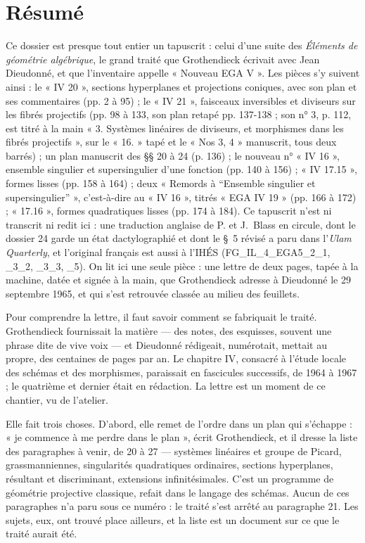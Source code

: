 \documentclass[11pt,a4paper]{article}
\begin{document}
\section*{Résumé}

\begin{resume}
Ce dossier est presque tout entier un tapuscrit : celui d'une suite des
\emph{Éléments de géométrie algébrique}, le grand traité que Grothendieck
écrivait avec Jean Dieudonné, et que l'inventaire appelle « Nouveau EGA V ». Les
pièces s'y suivent ainsi : le « IV 20 », sections hyperplanes et projections
coniques, avec son plan et ses commentaires (pp. 2 à 95) ; le « IV 21 »,
faisceaux inversibles et diviseurs sur les fibrés projectifs (pp. 98 à 133, son
plan retapé pp. 137-138 ; son n° 3, p. 112, est titré à la main « 3. Systèmes
linéaires de diviseurs, et morphismes dans les fibrés projectifs », sur le
« 16. » tapé et le « Nos 3, 4 » manuscrit, tous deux barrés) ; un plan manuscrit des §§ 20 à 24 (p. 136) ; le
nouveau n° « IV 16 », ensemble singulier et supersingulier d'une fonction
(pp. 140 à 156) ; « IV 17.15 », formes lisses (pp. 158 à 164) ; deux
« Remords à “Ensemble singulier et supersingulier” », c'est-à-dire au
« IV 16 », titrés « EGA IV 19 » (pp. 166 à 172) ; « 17.16 », formes quadratiques
lisses (pp. 174 à 184). Ce tapuscrit n'est ni transcrit ni redit ici : une
traduction anglaise de P. et J.~Blass en circule, dont le dossier 24 garde un
état dactylographié et dont le §~5 révisé a paru dans l'\emph{Ulam Quarterly},
et l'original français est aussi à l'IHÉS (FG\_IL\_4\_EGA5\_2\_1, \_3\_2,
\_3\_3, \_5). On lit ici une seule pièce : une lettre de deux pages, tapée à la
machine, datée et signée à la main, que Grothendieck adresse à Dieudonné le
29 septembre 1965, et qui s'est retrouvée classée au milieu des feuillets.

Pour comprendre la lettre, il faut savoir comment se fabriquait le traité.
Grothendieck fournissait la matière — des notes, des esquisses, souvent une
phrase dite de vive voix — et Dieudonné rédigeait, numérotait, mettait au
propre, des centaines de pages par an. Le chapitre IV, consacré à l'étude
locale des schémas et des morphismes, paraissait en fascicules successifs, de
1964 à 1967 ; le quatrième et dernier était en rédaction. La lettre est un moment de ce chantier, vu
de l'atelier.

Elle fait trois choses. D'abord, elle remet de l'ordre dans un plan qui
s'échappe : « je commence à me perdre dans le plan », écrit Grothendieck, et il
dresse la liste des paragraphes à venir, de 20 à 27 — systèmes linéaires et
groupe de Picard, grassmanniennes, singularités quadratiques ordinaires,
sections hyperplanes, résultant et discriminant, extensions infinitésimales.
C'est un programme de géométrie projective classique, refait dans le langage
des schémas. Aucun de ces paragraphes n'a paru sous ce numéro : le traité s'est
arrêté au paragraphe 21. Les sujets, eux, ont trouvé place ailleurs, et la
liste est un document sur ce que le traité aurait été.


\end{resume}
\end{document}
